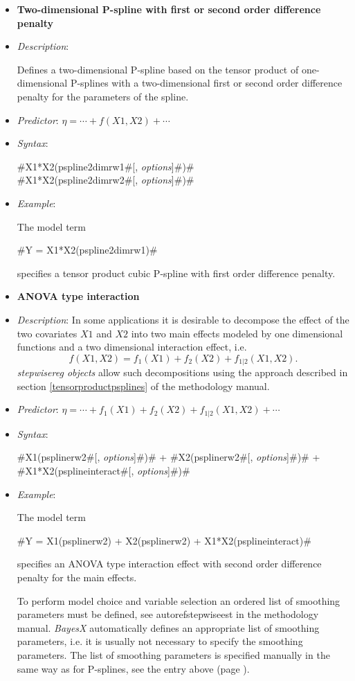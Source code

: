 \begin{itemize}
\item[]{\bf\sffamily Two-dimensional P-spline with first or second order difference penalty}

\item[] {\em Description}:

Defines a two-dimensional P-spline based on the tensor product of
one-dimensional P-splines with a two-dimensional first or second order
difference penalty for the parameters of the spline.
\item[] {\em
Predictor}: $\eta= \cdots + f(X1,X2) + \cdots$ \item[] {\em
Syntax}:

#X1*X2(pspline2dimrw1#[, {\em options}]#)# \\
#X1*X2(pspline2dimrw2#[, {\em options}]#)#
\item[] {\em Example}:

The model term

#Y = X1*X2(pspline2dimrw1)#

specifies a tensor product cubic P-spline with first order difference penalty.
\item[]{\bf\sffamily ANOVA type interaction}

\item[] {\em Description}:
In some applications it is desirable to decompose the effect of the two covariates
$X1$ and $X2$ into two main effects modeled by one dimensional functions and a two dimensional interaction effect, i.e.
\begin{equation}
\label{gampspline_2dimtermmain}
f \left(X1,X2\right) = f_1\left(X1 \right) +
f_2 \left(X2\right) + f_{1|2}\left(X1,X2 \right).
\end{equation}
{\em stepwisereg objects} allow such decompositions using the approach described in section
\autoref{tensorproductpsplines} of the methodology manual.
\item[] {\em
Predictor}: $\eta= \cdots + f_1(X1) + f_2(X2) + f_{1 | 2}(X1,X2) +  \cdots$
\item[] {\em Syntax}:

#X1(psplinerw2#[, {\em options}]#)# + #X2(psplinerw2#[, {\em options}]#)# + \\
#X1*X2(psplineinteract#[, {\em options}]#)#

\item[] {\em Example}:

The model term

#Y = X1(psplinerw2) + X2(psplinerw2) + X1*X2(psplineinteract)#

specifies an ANOVA type interaction effect with  second order difference penalty for the main effects.

To perform model choice and variable selection an ordered list of smoothing parameters must be defined, see
autoref{stepwiseest} in the methodology manual. {\em BayesX} automatically defines an appropriate list of smoothing
parameters, i.e. it is usually not necessary to  specify the smoothing parameters. The list of smoothing parameters is
specified manually in the same way as for P-splines, see the entry above (page \pageref{psplines_stepwise}).
\end{itemize}



